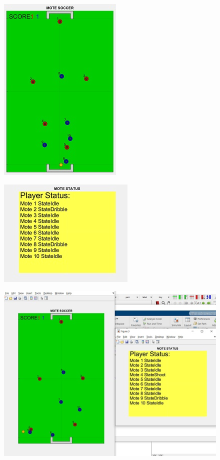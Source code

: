 \begin{figure}[H]
	\centering
	\includegraphics{8.jpg}
	\label{fig:label4}
\end{figure}

\begin{figure}[H]
	\centering
	\includegraphics{9.jpg}
	\label{fig:label4}
\end{figure}

\begin{figure}[H]
	\centering
	\includegraphics{10.jpg}
	\label{fig:label4}
\end{figure}

